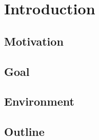 
\chapter{Introduction}\label{chapter:introduction}

\section{Motivation}
\section{Goal}
\section{Environment}
\section{Outline}
